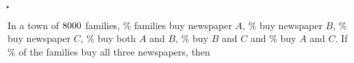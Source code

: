 

\DIVIDE{}\byhundred
\MULTIPLY\vbtwo\byhundred\a
\MULTIPLY\vbthree\byhundred\b
\MULTIPLY\vbfour\byhundred\c
\MULTIPLY\vbfive\byhundred\ab
\MULTIPLY\vbsix\byhundred\bc
\MULTIPLY\vbseven\byhundred\ca
\MULTIPLY\vbeight\byhundred\abc
\EXPR[0]{\na}{\a-\ab-\ca+\abc}
\EXPR[0]{\aunionbunionc}{\a+\b+\c-\ab-\bc-\ca+\abc}
\SUBTRACT\vbone\aunionbunionc\noabc

\question In a town of $8000$ families, \vbtwo\% families buy newspaper $A$, 
\vbthree\% buy newspaper $B$, \vbfour\% buy newspaper $C$, \vbfive\% buy both $A$ and $B$, 
\vbsix\% buy $B$ and $C$ and \vbseven\% buy $A$ and $C$. If \vbeight\% of the families buy all 
three newspapers, then 


\watchout[-50pt]

